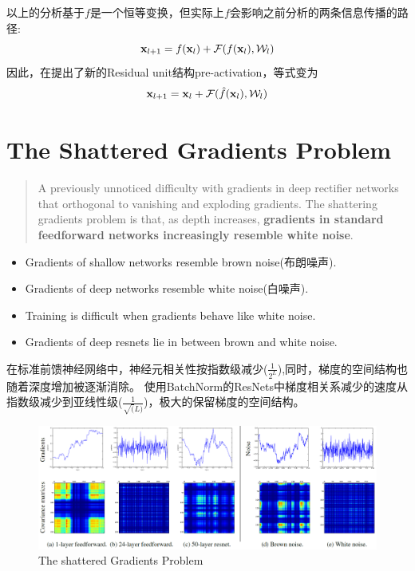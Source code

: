 以上的分析基于$f$是一个恒等变换，但实际上$f$会影响之前分析的两条信息传播的路径:
\begin{equation}
    \mathbf{x}_{l+1} = f(\mathbf{x}_l) + \mathcal{F}(f(\mathbf{x}_l), \mathcal{W}_l)
\end{equation}
因此，在\cite{He2016identity}提出了新的Residual unit结构pre-activation，等式变为
\begin{equation}
    \mathbf{x}_{l+1} = \mathbf{x}_l + \mathcal{F}(\hat f(\mathbf{x}_l), \mathcal{W}_l)
\end{equation}

\section{The Shattered Gradients Problem}
\begin{quotation}
    A previously unnoticed difficulty with gradients in deep rectifier networks that orthogonal
    to vanishing and exploding gradients. The shattering gradients problem is that, as depth increases,
    \textbf{gradients in standard feedforward networks increasingly resemble white noise}\cite{Balduzzi2017}.
\end{quotation}
\begin{itemize}
    \item Gradients of shallow networks resemble brown noise(布朗噪声).
    \item Gradients of deep networks resemble white noise(白噪声).
    \item Training is difficult when gradients behave like white noise.
    \item Gradients of deep resnets lie in between brown and white noise.
\end{itemize}

在标准前馈神经网络中，神经元相关性按指数级减少($\frac{1}{2^L}$),同时，梯度的空间结构也随着深度增加被逐渐消除。
使用BatchNorm的ResNets中梯度相关系减少的速度从指数级减少到亚线性级($\frac{1}{\sqrt(L)}$)，极大的保留梯度的空间结构。

\begin{figure}[H]
    \centering
    \includegraphics[width=14cm]{images/brown_white_noise.png}
    \caption{The shattered Gradients Problem}
    \label{fig:brown_white_noise}
\end{figure}


